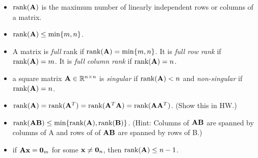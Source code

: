 \begin{itemize}
\item $\mbox{rank}(\mathbf{A})$ is the maximum number of linearly independent rows or columns of a matrix.

\item $\mbox{rank}(\mathbf{A}) \le \min\{m, n\}$.

\item A matrix is {\it full} rank if $\mbox{rank}(\mathbf{A}) = \min\{m, n\}$.  It is {\it full row rank} if $\mbox{rank}(\mathbf{A}) = m$.  It is {\it full column rank} if $\mbox{rank}(\mathbf{A}) = n$.

\item a square matrix $\mathbf{A} \in \mathbb{R}^{n \times n}$ is {\it singular} if $\mbox{rank}(\mathbf{A}) < n$ and {\it non-singular} if $\mbox{rank}(\mathbf{A}) = n$.

\item $\mbox{rank}(\mathbf{A}) = \mbox{rank}(\mathbf{A}^T) = \mbox{rank}(\mathbf{A}^T\mathbf{A}) = \mbox{rank}(\mathbf{A}\mathbf{A}^T)$. (Show this in HW.)

\item $\mbox{rank}(\mathbf{A}\mathbf{B}) \le \min\{\mbox{rank}(\mathbf{A}), \mbox{rank}(\mathbf{B})\}$. (Hint: Columns of $\mathbf{A}\mathbf{B}$ are spanned by columns of A and rows of of $\mathbf{A}\mathbf{B}$ are spanned by rows of B.)

\item if $\mathbf{Ax} = \mathbf{0}_m$ for some $\mathbf{x} \ne \mathbf{0}_n$, then $\mbox{rank}(\mathbf{A}) \le n - 1$.

\end{itemize}